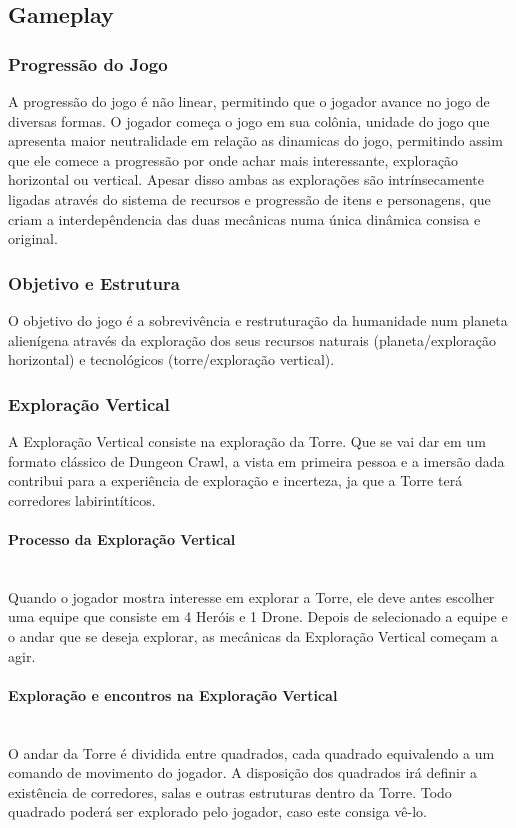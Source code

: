 \documentclass[11pt]{article} %
\begin{document}
\subsection{Gameplay}

\subsubsection{Progressão do Jogo}
A progressão do jogo é não linear, permitindo que o jogador avance no jogo de diversas formas. O jogador começa o jogo em sua colônia, unidade do jogo que apresenta maior neutralidade em relação as dinamicas do jogo, permitindo assim que ele comece a progressão por onde achar mais interessante, exploração horizontal ou vertical. Apesar disso ambas as explorações são intrínsecamente ligadas através do sistema de recursos e progressão de itens e personagens, que criam a interdepêndencia das duas mecânicas numa única dinâmica consisa e original. 

\subsubsection{Objetivo e Estrutura}
O objetivo do jogo é a sobrevivência e restruturação da humanidade num planeta alienígena através da exploração dos seus recursos naturais (planeta/exploração horizontal) e tecnológicos (torre/exploração vertical).

\subsubsection{Exploração Vertical}
A Exploração Vertical consiste na exploração da Torre. Que se vai dar em um formato clássico de Dungeon Crawl, a vista em primeira pessoa e a imersão dada contribui para a experiência de exploração e incerteza, ja que a Torre terá corredores labirintíticos.

\paragraph{Processo da Exploração Vertical} \mbox{}\\
Quando o jogador mostra interesse em explorar a Torre, ele deve antes escolher uma equipe que consiste em 4 Heróis e 1 Drone. Depois de selecionado a equipe e o andar que se deseja explorar, as mecânicas da Exploração Vertical começam a agir.

\paragraph{Exploração e encontros na Exploração Vertical} \mbox{}\\
O andar da Torre é dividida entre quadrados, cada quadrado equivalendo a um comando de movimento do jogador. A disposição dos quadrados irá definir a existência de corredores, salas e outras estruturas dentro da Torre. Todo quadrado poderá ser explorado pelo jogador, caso este consiga vê-lo.
\end{document}
